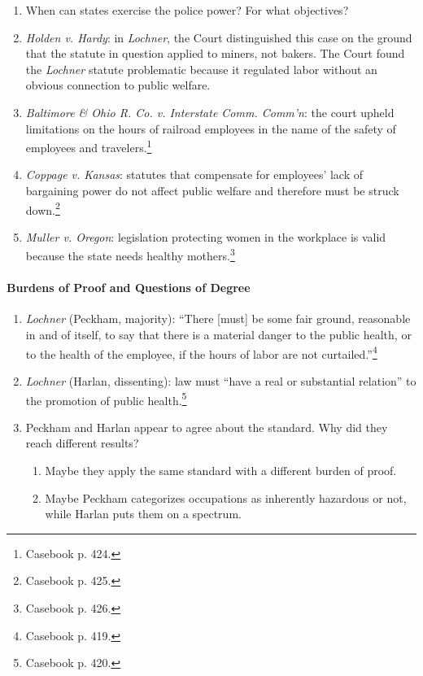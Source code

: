 \begin{enumerate}
    \item When can states exercise the police power? For what objectives?
    \item \emph{Holden v. Hardy}: in \emph{Lochner}, the Court distinguished 
    this case on the ground that the statute in question applied to miners, 
    not bakers. The Court found the \emph{Lochner} statute problematic 
    because it regulated labor without an obvious connection to public 
    welfare.
    \item \emph{Baltimore \& Ohio R. Co. v. Interstate Comm. Comm'n}: the 
    court upheld limitations on the hours of railroad employees in the name of 
    the safety of employees and travelers.\footnote{Casebook p. 424.}
    \item \emph{Coppage v. Kansas}: statutes that compensate for employees' 
    lack of bargaining power do not affect public welfare and therefore must 
    be struck down.\footnote{Casebook p. 425.}
    \item \emph{Muller v. Oregon}: legislation protecting women in the 
    workplace is valid because the state needs healthy 
    mothers.\footnote{Casebook p. 426.}
\end{enumerate}

\paragraph{Burdens of Proof and Questions of Degree}

\begin{enumerate}
    \item \emph{Lochner} (Peckham, majority): ``There [must] be some fair 
    ground, reasonable in and of itself, to say that there is a material 
    danger to the public health, or to the health of the employee, if the 
    hours of labor are not curtailed.''\footnote{Casebook p. 419.}
    \item \emph{Lochner} (Harlan, dissenting): law must ``have a real or 
    substantial relation'' to the promotion of public 
    health.\footnote{Casebook p. 420.}
    \item Peckham and Harlan appear to agree about the standard. Why did they 
    reach different results?
    \begin{enumerate}
        \item Maybe they apply the same standard with a different burden of 
        proof.
        \item Maybe Peckham categorizes occupations as inherently hazardous or 
        not, while Harlan puts them on a spectrum.
    \end{enumerate}
\end{enumerate}

